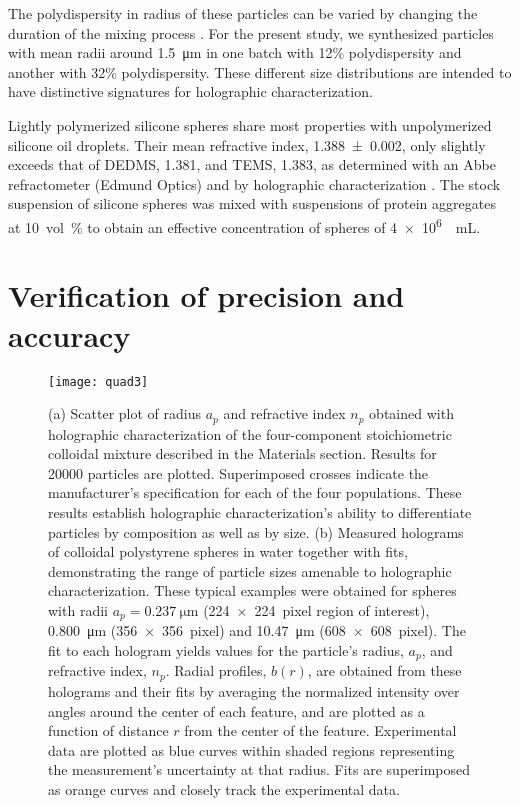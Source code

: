 The polydispersity in radius of these particles can be varied by changing the duration of the mixing process \cite{obey94,goller97, wang15}. For the present study, we synthesized particles with mean radii around \SI{1.5}{\um} in one batch with 12\% polydispersity and another with 32\% polydispersity. These different size distributions are intended to have distinctive signatures for holographic characterization.

Lightly polymerized silicone spheres share most properties with unpolymerized silicone oil droplets. Their mean refractive index, \num{1.388(2)}, only slightly exceeds that of DEDMS, \num{1.381}, and TEMS, \num{1.383}, as determined with an Abbe refractometer (Edmund Optics) and by holographic characterization \cite{lee07a, shpaisman12, wang15a}.
The stock suspension of silicone spheres was mixed with
suspensions of protein aggregates at \SI{10}{vol\percent}
to obtain an effective concentration of spheres of
\SI{4e6}{\per\mL}. 


\section{Verification of precision and accuracy}
\label{sec:verification}

\begin{figure}[!t]
  \centering
  \texttt{[image: quad3]}
  \caption[Holographic characterization of four types of particles]
    {(a) Scatter plot of radius $a_p$ and refractive index $n_p$
    obtained with holographic characterization of
    the four-component stoichiometric colloidal mixture described in the Materials 
    section. Results for \num{20000} particles
    are plotted.  Superimposed crosses indicate the
    manufacturer's specification for each of the four populations.
    These results establish holographic characterization's ability
    to differentiate particles by composition as well as by size.
    (b) Measured holograms of colloidal polystyrene spheres in water together with 
    fits, demonstrating the range of particle sizes amenable to holographic
    characterization. These typical examples were obtained for spheres with 
    radii $a_p = \SI{0.237}{\um}$ (\SI{224 x 224}{pixel} region of interest),
    \SI{0.800}{\um} (\SI{356 x 356}{pixel}) and \SI{10.47}{\um} 
    (\SI{608 x 608}{pixel}). The fit to each hologram yields values 
    for the particle’s radius, $a_p$, and refractive index, $n_p$. Radial 
    profiles, $b(r)$, are obtained from these holograms and their fits by 
    averaging the normalized intensity over angles around the center of each 
    feature, and are plotted as a function of distance $r$ from the center 
    of the feature. Experimental data are plotted as blue curves within shaded 
    regions representing the measurement’s uncertainty at that radius. Fits are 
    superimposed as orange curves and closely track the experimental data.}
  \label{fig:quad}
\end{figure}

